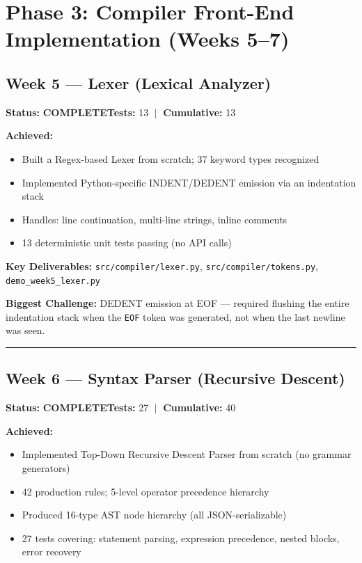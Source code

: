 \documentclass[a4paper,11pt]{article}
\newcommand{\done}{\colorbox{green!25}{\textbf{\small COMPLETE}}}
\begin{document}
\section{Phase 3: Compiler Front-End Implementation (Weeks 5--7)}

\subsection{Week 5 --- Lexer (Lexical Analyzer)}

\textbf{Status:} \done \hfill \textbf{Tests:} 13 $\;|\;$ \textbf{Cumulative:} 13

\textbf{Achieved:}
\begin{itemize}[leftmargin=*, itemsep=1pt]
    \item Built a Regex-based Lexer from scratch; 37 keyword types recognized
    \item Implemented Python-specific INDENT/DEDENT emission via an indentation stack
    \item Handles: line continuation, multi-line strings, inline comments
    \item 13 deterministic unit tests passing (no API calls)
\end{itemize}

\textbf{Key Deliverables:} \texttt{src/compiler/lexer.py}, \texttt{src/compiler/tokens.py}, \texttt{demo\_week5\_lexer.py}

\textbf{Biggest Challenge:} DEDENT emission at EOF --- required flushing the entire indentation stack when the \texttt{EOF} token was generated, not when the last newline was seen.

\vspace{4pt}\hrule\vspace{6pt}

\subsection{Week 6 --- Syntax Parser (Recursive Descent)}

\textbf{Status:} \done \hfill \textbf{Tests:} 27 $\;|\;$ \textbf{Cumulative:} 40

\textbf{Achieved:}
\begin{itemize}[leftmargin=*, itemsep=1pt]
    \item Implemented Top-Down Recursive Descent Parser from scratch (no grammar generators)
    \item 42 production rules; 5-level operator precedence hierarchy
    \item Produced 16-type AST node hierarchy (all JSON-serializable)
    \item 27 tests covering: statement parsing, expression precedence, nested blocks, error recovery
\end{itemize}
\end{document}
